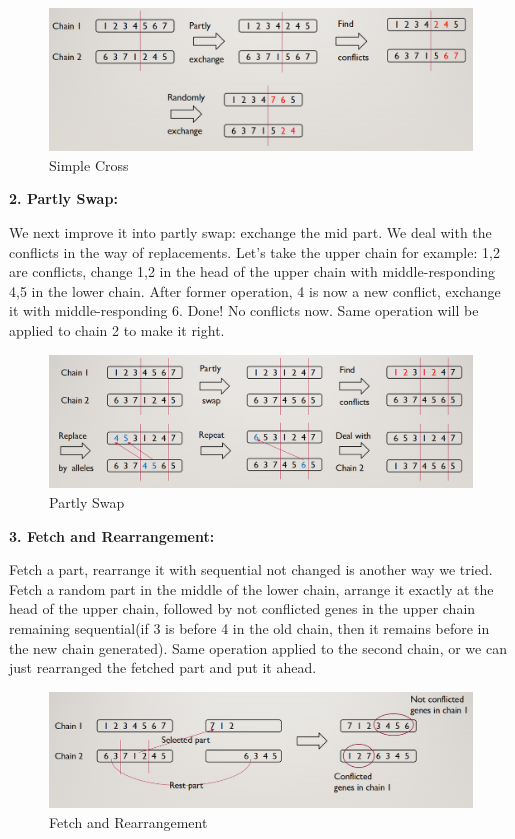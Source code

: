 \documentclass{acmtog} %
\begin{document}
\begin{figure}[ht]
\centering
\includegraphics[scale=0.35]{3}
\caption{Simple Cross}
\label{fig:label}
\end{figure}

{\bfseries 2. Partly Swap:}

We next improve it into partly swap: exchange the mid part. We deal with the conflicts in the way of replacements. Let’s take the upper chain for example: 1,2 are conflicts, change 1,2 in the head of the upper chain with middle-responding 4,5 in the lower chain. After former operation, 4 is now a new conflict, exchange it with middle-responding 6. Done! No conflicts now. Same operation will be applied to chain 2 to make it right. 

\begin{figure}[ht]
\centering
\includegraphics[scale=0.35]{4}
\caption{Partly Swap}
\label{fig:label}
\end{figure}

{\bfseries 3. Fetch and Rearrangement:}

Fetch a part, rearrange it with sequential not changed is another way we tried. Fetch a random part in the middle of the lower chain, arrange it exactly at the head of the upper chain, followed by not conflicted genes in the upper chain remaining sequential(if 3 is before 4 in the old chain, then it remains before in the new chain generated). Same operation applied to the second chain, or we can just rearranged the fetched part and put it ahead. 

\begin{figure}[ht]
\centering
\includegraphics[scale=0.35]{5}
\caption{Fetch and Rearrangement}
\label{fig:label}
\end{figure}
\end{document}
